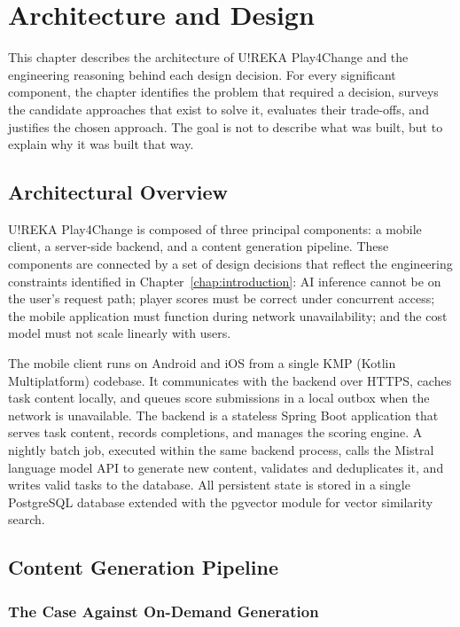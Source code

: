 %
%
\chapter{Architecture and Design}
\label{chap:architecture}

This chapter describes the architecture of U!REKA Play4Change and the engineering reasoning behind each design decision. For every significant component, the chapter identifies the problem that required a decision, surveys the candidate approaches that exist to solve it, evaluates their trade-offs, and justifies the chosen approach. The goal is not to describe what was built, but to explain why it was built that way.

\section{Architectural Overview}

U!REKA Play4Change is composed of three principal components: a mobile client, a server-side backend, and a content generation pipeline. These components are connected by a set of design decisions that reflect the engineering constraints identified in Chapter~\ref{chap:introduction}: AI inference cannot be on the user's request path; player scores must be correct under concurrent access; the mobile application must function during network unavailability; and the cost model must not scale linearly with users.

The mobile client runs on Android and iOS from a single KMP (Kotlin Multiplatform) codebase. It communicates with the backend over HTTPS, caches task content locally, and queues score submissions in a local outbox when the network is unavailable. The backend is a stateless Spring Boot application that serves task content, records completions, and manages the scoring engine. A nightly batch job, executed within the same backend process, calls the Mistral language model API to generate new content, validates and deduplicates it, and writes valid tasks to the database. All persistent state is stored in a single PostgreSQL database extended with the pgvector module for vector similarity search.

\section{Content Generation Pipeline}

\subsection{The Case Against On-Demand Generation}


